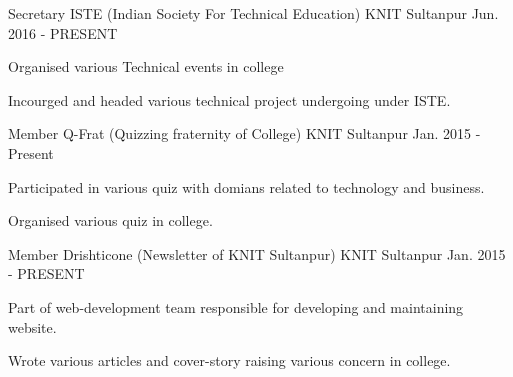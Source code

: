 \begin{cventries}
  \cventry
    {Secretary}
    {ISTE (Indian Society For Technical Education)}
    {KNIT Sultanpur}
    {Jun. 2016 - PRESENT}
    {
      \begin{cvitems}
        \item {Organised various Technical events in college}
        \item {Incourged and headed various technical project undergoing under ISTE.}
      \end{cvitems}
    }
  \cventry
    {Member}
    {Q-Frat (Quizzing fraternity of College)}
    {KNIT Sultanpur}
    {Jan. 2015 - Present}
    {
      \begin{cvitems}
        \item {Participated in various quiz with domians related to technology and business.}
        \item {Organised various quiz in college.}
      \end{cvitems}
    }
  \cventry
    {Member}
    {Drishticone (Newsletter of KNIT Sultanpur)}
    {KNIT Sultanpur}
    {Jan. 2015 - PRESENT}
    {
      \begin{cvitems}
        \item {Part of web-development team responsible for developing and maintaining website.}
        \item {Wrote various articles and cover-story raising various concern in college.}
      \end{cvitems}
    }
\end{cventries}
